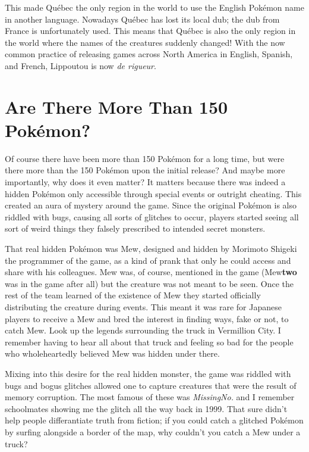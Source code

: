 \documentclass{book}
\begin{document}
This made Québec the only region in the world to use the English Pokémon name in another language. Nowadays Québec has lost its local dub; the dub from France is unfortunately used. This means that Québec is also the only region in the world where the names of the creatures suddenly changed! With the now common practice of releasing games across North America in English, Spanish, and French, Lippoutou is now \emph{de rigueur}.\par
\FloatBarrier\section*{Are There More Than 150 Pokémon?}
Of course there have been more than 150 Pokémon for a long time, but were there more than the 150 Pokémon upon the initial release? And maybe more importantly, why does it even matter? It matters because there was indeed a hidden Pokémon only accessible through special events or outright cheating. This created an aura of mystery around the game. Since the original Pokémon is also riddled with bugs, causing all sorts of glitches to occur, players started seeing all sort of weird things they falsely prescribed to intended secret monsters.\par
That real hidden Pokémon was Mew, designed and hidden by Morimoto Shigeki the programmer of the game, as a kind of prank that only he could access and share with his colleagues. Mew was, of course, mentioned in the game (Mew\textbf{two} was in the game after all) but the creature was not meant to be seen. Once the rest of the team learned of the existence of Mew they started officially distributing the creature during events. This meant it was rare for Japanese players to receive a Mew and bred the interest in finding ways, fake or not, to catch Mew. Look up the legends surrounding the truck in Vermillion City. I remember having to hear all about that truck and feeling so bad for the people who wholeheartedly believed Mew was hidden under there.\par
Mixing into this desire for the real hidden monster, the game was riddled with bugs and bogus glitches allowed one to capture creatures that were the result of memory corruption. The most famous of these was \emph{MissingNo.} and I remember schoolmates showing me the glitch all the way back in 1999. That sure didn’t help people differantiate truth from fiction; if you could catch a glitched Pokémon by surfing alongside a border of the map, why couldn’t you catch a Mew under a truck?\par
\end{document}
